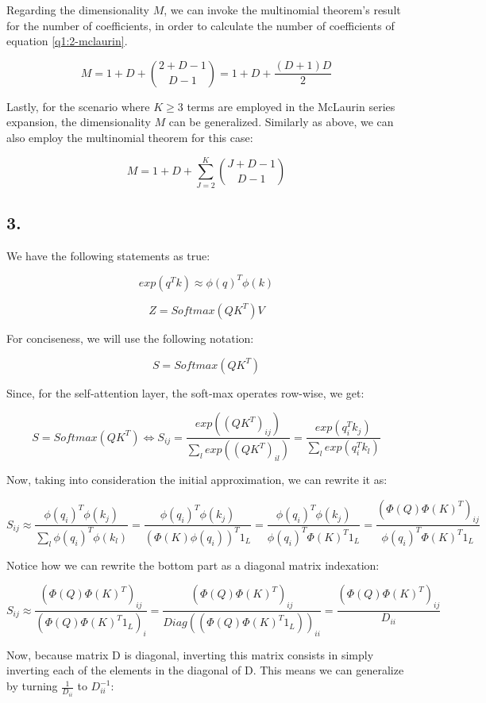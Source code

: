\documentclass[11pt]{article}
\begin{document}
Regarding the dimensionality \(M\), we can invoke the multinomial theorem's result for the number of coefficients, in order to calculate the number of coefficients of equation \ref{q1:2-mclaurin}.

\[
    M = 1 + D + \binom{2 + D - 1}{D - 1} = 1 + D + \frac{(D+1)D}{2}
\]

Lastly, for the scenario where $K \geq 3$ terms are employed in the McLaurin series expansion, the dimensionality $M$ can be generalized. Similarly as above, we can also employ the multinomial theorem for this case:

\[
    M = 1 + D + \sum_{J=2}^{K}{\binom{J + D - 1}{D - 1}}
\]

\subsection*{3.}

We have the following statements as true:

\[
    exp(q^Tk) \approx \phi(q)^T \phi(k)
\]

\[
    Z = Softmax(QK^T)V
\]

For conciseness, we will use the following notation:

\[
    S = Softmax(QK^T)
\]

Since, for the self-attention layer, the soft-max operates row-wise, we get:

\[
    S = Softmax(QK^T) \Leftrightarrow S_{ij} = \frac{exp((QK^T)_{ij})}{\sum_l{exp((QK^T)_{il})}} = \frac{exp(q_i^T k_j)}{\sum_l{exp(q_i^T k_l)}}
\]

Now, taking into consideration the initial approximation, we can rewrite it as:

\[
    S_{ij} \approx \frac{\phi(q_i)^T \phi(k_j)}{\sum_l{\phi(q_i)^T \phi(k_l)}}  = \frac{\phi(q_i)^T \phi(k_j)}{(\Phi(K)\phi(q_i))^T 1_L}  = \frac{\phi(q_i)^T \phi(k_j)}{\phi(q_i)^T \Phi(K)^T 1_L}  = \frac{(\Phi(Q) \Phi(K)^T)_{ij}}{\phi(q_i)^T \Phi(K)^T 1_L}
\]

Notice how we can rewrite the bottom part as a diagonal matrix indexation:

\[
    S_{ij} \approx \frac{(\Phi(Q) \Phi(K)^T)_{ij}}{(\Phi(Q) \Phi(K)^T 1_L)_{i}}  = \frac{(\Phi(Q) \Phi(K)^T)_{ij}}{Diag((\Phi(Q) \Phi(K)^T 1_L))_{ii}}  = \frac{(\Phi(Q) \Phi(K)^T)_{ij}}{D_{ii}}
\]

Now, because matrix D is diagonal, inverting this matrix consists in simply inverting each of the elements in the diagonal of D. This means we can generalize by turning $\frac{1}{D_{ii}}$ to $D^{-1}_{ii}$:
\end{document}

